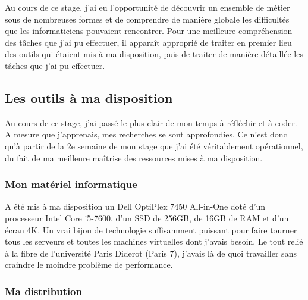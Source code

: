 \documentclass{article}
\begin{document}
Au cours de ce stage, j’ai eu l’opportunité de découvrir un ensemble de métier sous de nombreuses formes et de comprendre de manière globale les difficultés que les informaticiens pouvaient rencontrer. Pour une meilleure compréhension des tâches que j’ai pu effectuer, il apparaît approprié de traiter en premier lieu des outils qui étaient mis à ma disposition, puis de traiter de manière détaillée les tâches que j’ai pu effectuer.

\subsection{Les outils à ma disposition}

Au cours de ce stage, j’ai passé le plus clair de mon temps à réfléchir et à coder. A mesure que j’apprenais, mes recherches se sont approfondies. Ce n’est donc qu’à partir de la 2e semaine de mon stage que j’ai été véritablement opérationnel, du fait de ma meilleure maîtrise des ressources mises à ma disposition.

\subsubsection{Mon matériel informatique}

A été mis à ma disposition un Dell OptiPlex 7450 All-in-One doté d'un processeur Intel Core i5-7600, d'un SSD de 256GB, de 16GB de RAM et d'un écran 4K. Un vrai bijou de technologie suffisamment puissant pour faire tourner tous les serveurs et toutes les machines virtuelles dont j'avais besoin.
Le tout relié à la fibre de l'université Paris Diderot (Paris 7), j'avais là de quoi travailler sans craindre le moindre problème de performance.

\subsubsection{Ma distribution}
\end{document}
